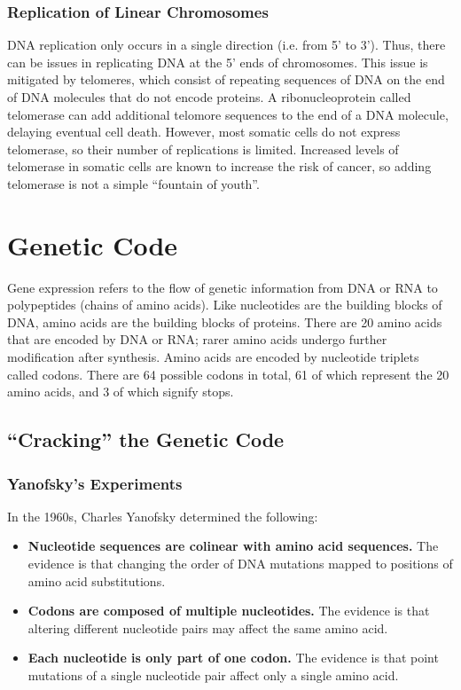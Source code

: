 \documentclass[12pt,titlepage]{article}
\begin{document}
      \subsubsection{Replication of Linear Chromosomes}
        DNA replication only occurs in a single direction (i.e. from 5' to 3'). Thus, there can be issues in replicating DNA at the 5' ends of chromosomes.
        This issue is mitigated by telomeres, which consist of repeating sequences of DNA on the end of DNA molecules that do not encode proteins. A
        ribonucleoprotein called telomerase can add additional telomore sequences to the end of a DNA molecule, delaying eventual cell death. However, most
        somatic cells do not express telomerase, so their number of replications is limited. Increased levels of telomerase in somatic cells are known to increase
        the risk of cancer, so adding telomerase is not a simple ``fountain of youth''.

  \newpage

  \section{Genetic Code}
    Gene expression refers to the flow of genetic information from DNA or RNA to polypeptides (chains of amino acids). Like nucleotides are the building blocks
    of DNA, amino acids are the building blocks of proteins. There are 20 amino acids that are encoded by DNA or RNA; rarer amino acids undergo further modification
    after synthesis. Amino acids are encoded by nucleotide triplets called codons. There are 64 possible codons in total, 61 of which represent the 20 amino acids,
    and 3 of which signify stops.

    \subsection{``Cracking'' the Genetic Code}

      \subsubsection{Yanofsky's Experiments}
        In the 1960s, Charles Yanofsky determined the following:
        \begin{itemize}
          \item \textbf{Nucleotide sequences are colinear with amino acid sequences.} The evidence is that changing the order of DNA mutations mapped to positions
            of amino acid substitutions.
          \item \textbf{Codons are composed of multiple nucleotides.} The evidence is that altering different nucleotide pairs may affect the same amino acid.
          \item \textbf{Each nucleotide is only part of one codon.} The evidence is that point mutations of a single nucleotide pair affect only a single amino acid.
        \end{itemize}
\end{document}
